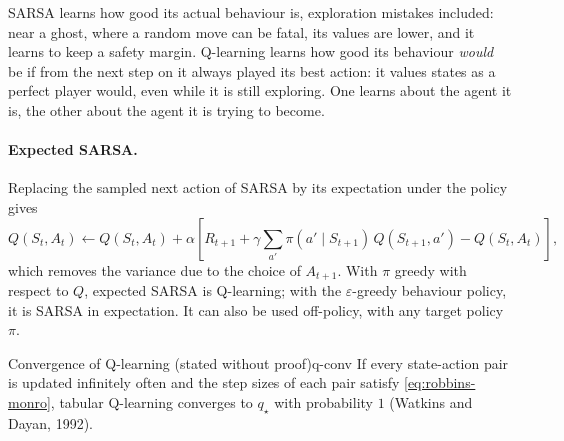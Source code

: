 \begin{intuition}
  SARSA learns how good its actual behaviour is, exploration mistakes
  included: near a ghost, where a random move can be fatal, its values are
  lower, and it learns to keep a safety margin. Q-learning learns how good
  its behaviour \emph{would} be if from the next step on it always played
  its best action: it values states as a perfect player would, even while
  it is still exploring. One learns about the agent it is, the other about
  the agent it is trying to become.
\end{intuition}

\paragraph{Expected SARSA.} Replacing the sampled next action of SARSA by
its expectation under the policy gives
\begin{equation}
  Q(S_t, A_t) \gets Q(S_t, A_t) + \alpha \left[ R_{t+1} + \gamma \sum_{a'}
  \pi(a' \mid S_{t+1})\, Q(S_{t+1}, a') - Q(S_t, A_t) \right],
\end{equation}
which removes the variance due to the choice of $A_{t+1}$. With $\pi$
greedy with respect to $Q$, expected SARSA is Q-learning; with the
$\varepsilon$-greedy behaviour policy, it is SARSA in expectation. It can
also be used off-policy, with any target policy $\pi$.

\begin{theorem}{Convergence of Q-learning (stated without proof)}{q-conv}
  If every state-action pair is updated infinitely often and the step sizes
  of each pair satisfy \eqref{eq:robbins-monro}, tabular Q-learning
  converges to $q_\star$ with probability $1$ (Watkins and Dayan, 1992).
\end{theorem}

